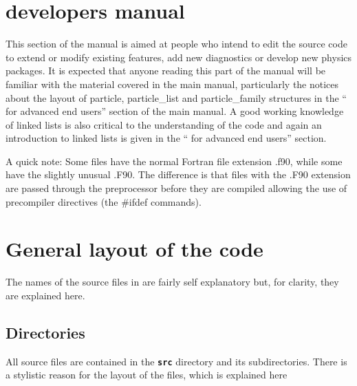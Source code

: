 \documentclass[12pt,a4paper]{article}
\newcommand{\inlinecode}[1]{{\color{warwickred} \bf\texttt{#1}}}
\newcommand{\EPOCH}{{\color{warwickdark}\fontfamily{phv}\selectfont{EPOCH}}}
\begin{document}
{
  \selectfont
}

\section{{\EPOCH} developers manual}
This section of the manual is aimed at people who intend to edit the {\EPOCH}
source code to extend or modify existing features, add new diagnostics or
develop new physics packages. It is expected that anyone reading this part of
the manual will be familiar with the material covered in the main manual,
particularly the notices about the layout of particle, particle\_list and
particle\_family structures in the ``{\EPOCH} for advanced end users'' section
of the main manual. A good working knowledge of linked lists is also critical to
the understanding of the code and again an introduction to linked lists is
given in the ``{\EPOCH} for advanced end users'' section.

A quick note: Some files have the normal Fortran file extension .f90, while
some have the slightly unusual .F90. The difference is that files with the
.F90 extension are passed through the preprocessor before they are compiled
allowing the use of precompiler directives (the \#ifdef commands).

\section{General layout of the {\EPOCH} code}

The names of the source files in {\EPOCH} are fairly self explanatory but, for
clarity, they are explained here.

\subsection{Directories}
All source files are contained in the \inlinecode{src} directory and its
subdirectories. There is a stylistic reason for the layout of the files, which
is explained here
\end{document}
